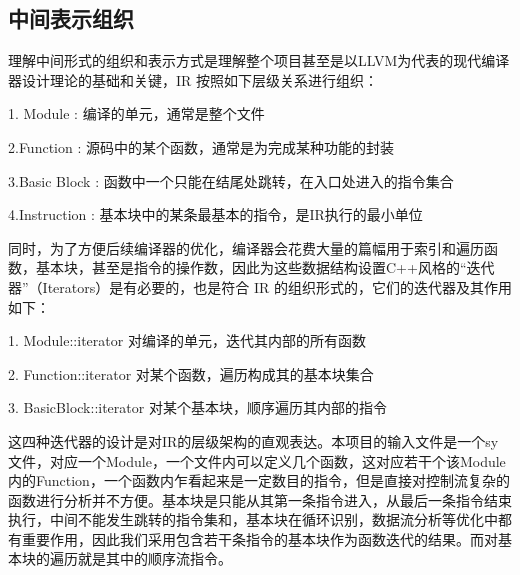 \subsection{中间表示组织}
理解中间形式的组织和表示方式是理解整个项目甚至是以LLVM为代表的现代编译器设计理论的基础和关键，IR 按照如下层级关系进行组织：

1. Module : 编译的单元，通常是整个文件 

2.Function : 源码中的某个函数，通常是为完成某种功能的封装   

3.Basic Block : 函数中一个只能在结尾处跳转，在入口处进入的指令集合       

4.Instruction : 基本块中的某条最基本的指令，是IR执行的最小单位


同时，为了方便后续编译器的优化，编译器会花费大量的篇幅用于索引和遍历函数，基本块，甚至是指令的操作数，因此为这些数据结构设置C++风格的“迭代器”（Iterators）是有必要的，也是符合 IR 的组织形式的，它们的迭代器及其作用如下：

1. Module::iterator 对编译的单元，迭代其内部的所有函数

2. Function::iterator 对某个函数，遍历构成其的基本块集合

3. BasicBlock::iterator 对某个基本块，顺序遍历其内部的指令

这四种迭代器的设计是对IR的层级架构的直观表达。本项目的输入文件是一个sy文件，对应一个Module，一个文件内可以定义几个函数，这对应若干个该Module内的Function，一个函数内乍看起来是一定数目的指令，但是直接对控制流复杂的函数进行分析并不方便。基本块是只能从其第一条指令进入，从最后一条指令结束执行，中间不能发生跳转的指令集和，基本块在循环识别，数据流分析等优化中都有重要作用，因此我们采用包含若干条指令的基本块作为函数迭代的结果。而对基本块的遍历就是其中的顺序流指令。